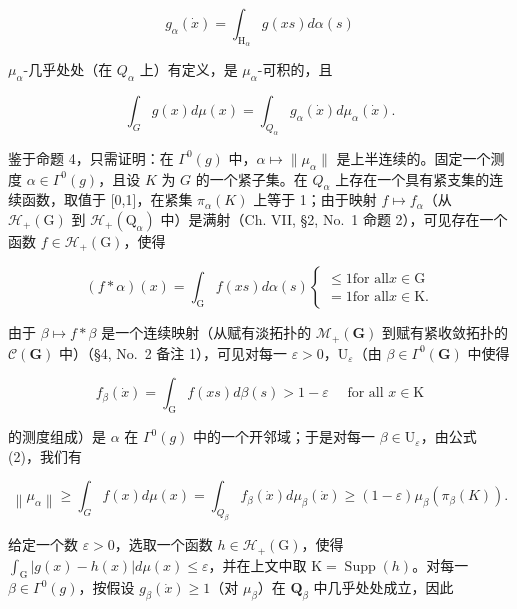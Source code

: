 \[
g _ {\alpha} (\dot {x}) = \int_ {\mathrm{H} _ {\alpha}} g (x s) d \alpha (s)
\]

\(\mu_{\alpha}\)-几乎处处（在 \(Q_{\alpha}\) 上）有定义，是 \(\mu_{\alpha}\)-可积的，且

\[
\int_ {G} g (x) d \mu (x) = \int_ {Q _ {\alpha}} g _ {\alpha} (\dot {x}) d \mu_ {\alpha} (\dot {x}).\tag{4}
\]

鉴于命题 4，只需证明：在 \(\Gamma^0(g)\) 中，\(\alpha \mapsto \| \mu_\alpha \|\) 是上半连续的。固定一个测度 \(\alpha \in \Gamma^0(g)\)，且设 \(K\) 为 \(G\) 的一个紧子集。在 \(Q_\alpha\) 上存在一个具有紧支集的连续函数，取值于 {[}0,1{]}，在紧集 \(\pi_\alpha(K)\) 上等于 1；由于映射 \(f \mapsto f_\alpha\)（从 \(\mathcal{H}_+(\mathrm{G})\) 到 \(\mathcal{H}_+(\mathrm{Q}_\alpha)\) 中）是满射（Ch. VII, §2, No.~1 命题 2），可见存在一个函数 \(f \in \mathcal{H}_+(\mathrm{G})\)，使得

\[
(f * \alpha) (x) = \int_ {\mathrm{G}} f (x s)   d \alpha (s) \left\{ \begin{array}{l} \leqslant 1 \text {for all} x \in \mathrm{G} \\ = 1 \text {for all} x \in \mathrm{K}. \end{array} \right.
\]

由于 \(\beta \mapsto f * \beta\) 是一个连续映射（从赋有淡拓扑的 \(\mathcal{M}_{+}(\mathbf{G})\) 到赋有紧收敛拓扑的 \(\mathcal{C}(\mathbf{G})\) 中）（§4, No.~2 备注 1），可见对每一 \(\varepsilon > 0\)，\(\mathrm{U}_{\varepsilon}\)（由 \(\beta \in \Gamma^0 (\mathbf{G})\) 中使得

\[
f _ {\beta} (\dot {x}) = \int_ {\mathrm{G}} f (x s) d \beta (s) > 1 - \varepsilon \quad \text { for   all } x \in \mathrm{K}
\]

的测度组成）是 \(\alpha\) 在 \(\Gamma^0 (g)\) 中的一个开邻域；于是对每一 \(\beta \in \mathrm{U}_{\varepsilon}\)，由公式 (2)，我们有

\[
\left\| \mu_ {\alpha} \right\| \geqslant \int_ {G} f (x) d \mu (x) = \int_ {Q _ {\beta}} f _ {\beta} (\dot {x}) d \mu_ {\beta} (\dot {x}) \geqslant (1 - \varepsilon) \mu_ {\beta} \left(\pi_ {\beta} (K)\right).\tag{5}
\]

给定一个数 \(\varepsilon > 0\)，选取一个函数 \(h \in \mathcal{H}_{+}(\mathrm{G})\)，使得 \(\int_{\mathrm{G}} |g(x) - h(x)| d\mu(x) \leqslant \varepsilon\)，并在上文中取 \(\mathrm{K} = \operatorname{Supp}(h)\)。对每一 \(\beta \in \Gamma^0(g)\)，按假设 \(g_\beta(\dot{x}) \geqslant 1\)（对 \(\mu_\beta\)）在 \(\mathbf{Q}_\beta\) 中几乎处处成立，因此

